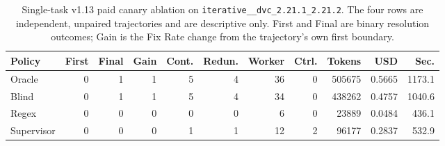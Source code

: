 \begin{table}[t]
  \caption{Single-task v1.13 paid canary ablation on \texttt{iterative\_\_dvc\_2.21.1\_2.21.2}. The four rows are independent, unpaired trajectories and are descriptive only. First and Final are binary resolution outcomes; Gain is the Fix Rate change from the trajectory's own first boundary.}
  \label{tab:canary-ablation}
  \centering
  \small
  \begin{tabular}{lrrrrrrrrrr}
    \toprule
    Policy & First & Final & Gain & Cont. & Redun. & Worker & Ctrl. & Tokens & USD & Sec. \\
    \midrule
    Oracle & 0 & 1 & 1 & 5 & 4 & 36 & 0 & 505675 & 0.5665 & 1173.1 \\
    Blind & 0 & 1 & 1 & 5 & 4 & 34 & 0 & 438262 & 0.4757 & 1040.6 \\
    Regex & 0 & 0 & 0 & 0 & 0 & 6 & 0 & 23889 & 0.0484 & 436.1 \\
    Supervisor & 0 & 0 & 0 & 1 & 1 & 12 & 2 & 96177 & 0.2837 & 532.9 \\
    \bottomrule
  \end{tabular}
\end{table}
